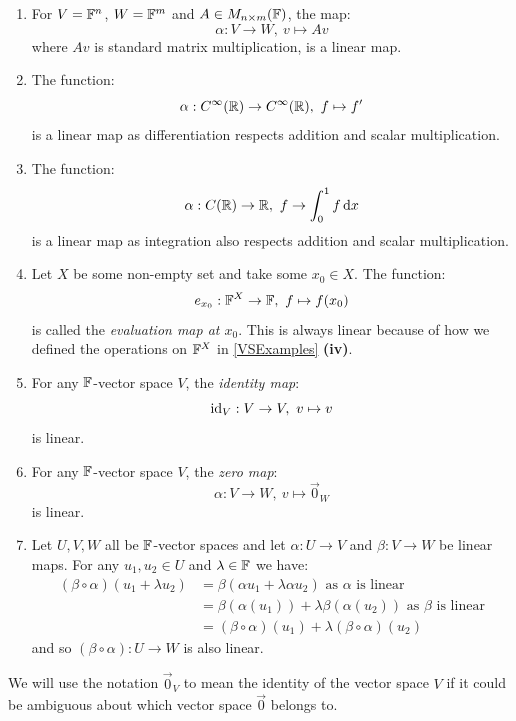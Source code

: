 \documentclass[../main.tex]{subfiles}
\begin{document}
\begin{example} \label{linearMapEx}
  \begin{enumerate}
    \item For $V = \mathbb{F}^{n}$, $W = \mathbb{F}^{m}$ and $A \in M_{n \times m}(\mathbb{F})$, the map:
      \[
        \alpha: V \to W,\ v \mapsto Av
      \]
      where $Av$ is standard matrix multiplication, is a linear map.
    \item The function:
      \[
        \alpha: C^{\infty}(\mathbb{R}) \to C^{\infty}(\mathbb{R}),\ f \mapsto f'
      \]
      is a linear map as differentiation respects addition and scalar multiplication.
    \item The function:
      \[
        \alpha: C(\R) \to \R,\ f \to \int_{0}^{1} f \d{x}
      \]
      is a linear map as integration also respects addition and scalar multiplication.
    \item Let $X$ be some non-empty set and take some $x_0 \in X$.
      The function:
      \[
        e_{x_0}: \mathbb{F}^{X} \to \mathbb{F},\ f \mapsto f(x_0)
      \]
      is called the \textit{evaluation map at $x_0$}.
      This is always linear because of how we defined the operations on $\mathbb{F}^{X}$ in \cref{VSExamples} \textbf{(iv)}.
    \item For any $\mathbb{F}$-vector space $V$, the \textit{identity map}:
      \[
        \id_V: V \to V,\ v \mapsto v
      \]
      is linear.
    \item For any $\mathbb{F}$-vector space $V$, the \textit{zero map}:
      \[
        \alpha: V \to W,\ v \mapsto \vec{0}_{W}
      \]
      is linear.
    \item Let $U, V, W$ all be $\mathbb{F}$-vector spaces and let $\alpha: U \to V$ and $\beta: V \to W$ be linear maps.
      For any $u_1, u_2 \in U$ and $\lambda \in \mathbb{F}$ we have:
      \begin{align*}
        (\beta \circ \alpha) (u_1 + \lambda u_2) &= \beta(\alpha u_1 + \lambda \alpha u_2) \text{ as $\alpha$ is linear} \\
                                                 &= \beta(\alpha(u_1)) + \lambda \beta(\alpha(u_2)) \text{ as $\beta$ is linear} \\
                                                 &= (\beta \circ \alpha)(u_1) + \lambda (\beta \circ \alpha)(u_2)
      \end{align*}
      and so $(\beta \circ \alpha): U \to W$ is also linear.
  \end{enumerate}
\end{example}
\begin{remark}[Notation]
  We will use the notation $\vec{0}_V$ to mean the identity of the vector space $V$ if it could be ambiguous about which vector space $\vec{0}$ belongs to.
\end{remark}
\end{document}
